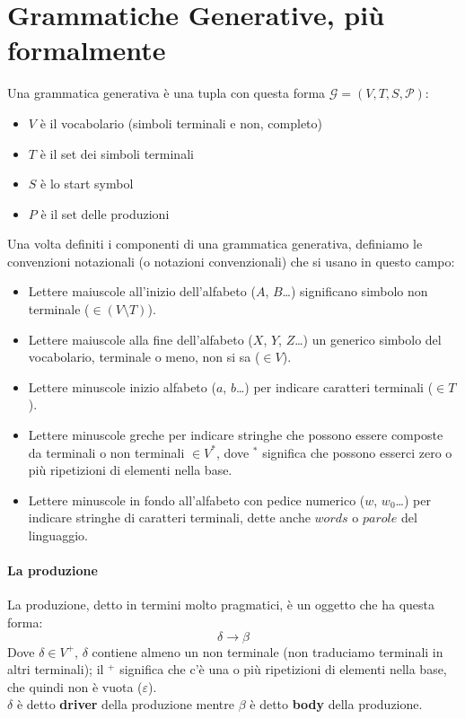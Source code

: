 \documentclass[class=book, crop=false, oneside, 12pt]{standalone}
\begin{document}
\section{Grammatiche Generative, più formalmente}
Una grammatica generativa è una tupla con questa forma \(\mathcal{G}=(V, T, S, \mathcal{P})\):
\begin{itemize}
    \item \(V\) è il vocabolario (simboli terminali e non, completo)
    \item \(T\) è il set dei simboli terminali
    \item \(S\) è lo start symbol
    \item \(P\) è il set delle produzioni
\end{itemize}
Una volta definiti i componenti di una grammatica generativa, definiamo le convenzioni notazionali (o notazioni convenzionali) che si usano in questo campo:
\begin{itemize}
    \item Lettere maiuscole all’inizio dell’alfabeto (\(A\), \(B\)…) significano simbolo non terminale (\(\in (V \setminus T)\)).
    \item Lettere maiuscole alla fine dell’alfabeto (\(X\), \(Y\), \(Z\)…) un generico simbolo del vocabolario, terminale o meno, non si sa (\(\in V\)).
    \item Lettere minuscole inizio alfabeto (\(a\), \(b\)…) per indicare caratteri terminali (\(\in T\)).
    \item Lettere minuscole greche per indicare stringhe che possono essere composte da terminali o non terminali \(\in V^*\), dove \(^*\) significa che possono esserci zero o più ripetizioni di elementi nella base.
    \item Lettere minuscole in fondo all’alfabeto con pedice numerico (\(w\), \(w_0\)…) per indicare stringhe di caratteri terminali, dette anche \(words\) o \(parole\) del linguaggio. 
\end{itemize}

\paragraph{La produzione}
La produzione, detto in termini molto pragmatici, è un oggetto che ha questa forma:
\begin{equation}
    \delta \to \beta
\end{equation}
Dove \(\delta \in V^+\), \(\delta\) contiene almeno un non terminale (non traduciamo terminali in altri terminali); il \(^+\) significa che c’è una o più ripetizioni di elementi nella base, che quindi non è vuota (\(\varepsilon\)).\\
\(\delta\) è detto \textbf{driver} della produzione mentre \(\beta\) è detto \textbf{body} della produzione.
\end{document}
